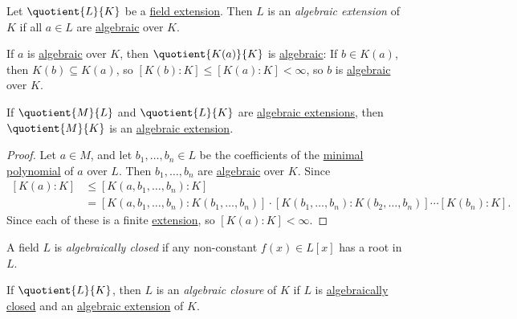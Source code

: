 \begin{definition}\label{def:algebraic-extension}
	Let \(\quotient{L}{K} \) be a \hyperref[def:field-extension]{field extension}. Then \(L\) is an \emph{algebraic extension} of \(K\) if all \(a\in L\) are \hyperref[def:algebraic]{algebraic} over \(K\).
\end{definition}

If \(a\) is \hyperref[def:algebraic]{algebraic} over \(K\), then \(\quotient{K(a)}{K} \) is \hyperref[def:algebraic-extension]{algebraic}: If \(b\in K(a)\), then \(K(b) \subseteq K(a)\), so \([K(b) \colon K] \leq [K(a) \colon K] < \infty \), so \(b\) is \hyperref[def:algebraic]{algebraic} over \(K\).

\begin{theorem}
	If \(\quotient{M}{L} \) and \(\quotient{L}{K} \) are \hyperref[def:algebraic-extension]{algebraic extensions}, then \(\quotient{M}{K} \) is an \hyperref[def:algebraic-extension]{algebraic extension}.
\end{theorem}
\begin{proof}
	Let \(a\in M\), and let \(b_1, \ldots , b_n\in L\) be the coefficients of the \hyperref[def:minimal-polynomial]{minimal polynomial} of \(a\) over \(L\). Then \(b_1, \ldots , b_n\) are \hyperref[def:algebraic]{algebraic} over \(K\). Since
	\[
		\begin{split}
			[K(a) \colon K]
			&\leq [K(a, b_1, \ldots , b_n) \colon K]\\
			&= [K(a, b_1, \ldots , b_n) \colon K(b_1, \ldots , b_n)] \cdot [K(b_1, \ldots , b_n) \colon K(b_2, \ldots , b_n)] \cdots [K(b_n) \colon K].
		\end{split}
	\]
	Since each of these is a finite \hyperref[def:field-extension]{extension}, so \([K(a) \colon K] < \infty \).
\end{proof}

\begin{definition}\label{def:algebraically-closed}
	A field \(L\) is \emph{algebraically closed} if any non-constant \(f(x)\in L[x]\) has a root in \(L\).
\end{definition}

\begin{definition}\label{def:algebraically-closure}
	If \(\quotient{L}{K} \), then \(L\) is an \emph{algebraic closure} of \(K\) if \(L\) is \hyperref[def:algebraically-closed]{algebraically closed} and an \hyperref[def:algebraic-extension]{algebraic extension} of \(K\).
\end{definition}

